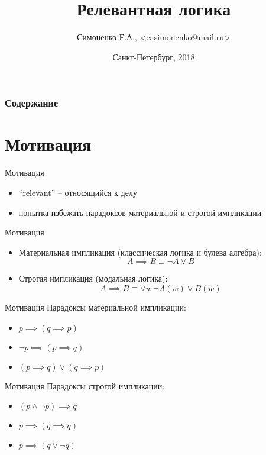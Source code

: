 \documentclass[14pt]{beamer}
\title[Релевантная логика]{Релевантная логика}
\author[]{Симоненко Е.А., <easimonenko@mail.ru>}
\institute[]{Университет ИТМО}
\date[]{Санкт-Петербург, 2018}
\begin{document}
\begin{darkbars}
    \begin{frame}
        \titlepage
    \end{frame}
\end{darkbars}

\begin{frame}
	\frametitle{Содержание}
	\tableofcontents
\end{frame}

\section{Мотивация}

\begin{frame}[nologo]{Мотивация}
	\begin{itemize}
		\item ``relevant'' -- относящийся к делу
		\item попытка избежать парадоксов материальной и строгой импликации
		
	\end{itemize}
\end{frame}

\begin{frame}[nologo]{Мотивация}
	\begin{itemize}
		\item Материальная импликация (классическая логика и булева алгебра): 
		\[ A \implies B \equiv \neg A \vee B \]
		\item Строгая импликация (модальная логика): \[ A \implies B \equiv 
		\forall w~\neg A(w) \vee B(w) \]
	\end{itemize}
\end{frame}

\begin{frame}[nologo]{Мотивация}
	Парадоксы материальной импликации:
	
	\begin{itemize}
		\item $ p \implies (q \implies p) $
		\item $ \neg p \implies (p \implies q) $
		\item $ (p \implies q) \vee (q \implies p) $
	\end{itemize}
\end{frame}

\begin{frame}[nologo]{Мотивация}
	Парадоксы строгой импликации:
	
	\begin{itemize}
		\item $ (p \wedge \neg p) \implies q $
		\item $ p \implies (q \implies q) $
		\item $ p \implies (q \vee \neg q) $
	\end{itemize}
\end{frame}
\end{document}
